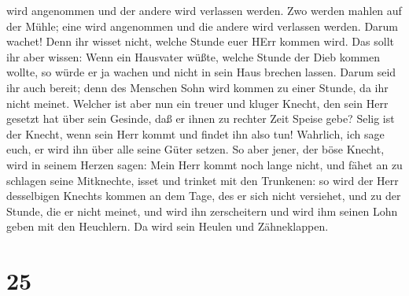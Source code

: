 wird angenommen und der andere wird verlassen werden.  Zwo
werden mahlen auf der Mühle; eine wird angenommen und die andere wird
verlassen werden.  Darum wachet! Denn ihr wisset nicht,
welche Stunde euer HErr kommen wird.  Das sollt ihr aber
wissen: Wenn ein Hausvater wüßte, welche Stunde der Dieb kommen wollte,
so würde er ja wachen und nicht in sein Haus brechen lassen.
 Darum seid ihr auch bereit; denn des Menschen Sohn wird
kommen zu einer Stunde, da ihr nicht meinet.  Welcher ist
aber nun ein treuer und kluger Knecht, den sein Herr gesetzt hat über
sein Gesinde, daß er ihnen zu rechter Zeit Speise gebe? 
Selig ist der Knecht, wenn sein Herr kommt und findet ihn also tun!
 Wahrlich, ich sage euch, er wird ihn über alle seine Güter
setzen.  So aber jener, der böse Knecht, wird in seinem
Herzen sagen: Mein Herr kommt noch lange nicht,  und fähet
an zu schlagen seine Mitknechte, isset und trinket mit den Trunkenen:
 so wird der Herr desselbigen Knechts kommen an dem Tage,
des er sich nicht versiehet, und zu der Stunde, die er nicht meinet,
 und wird ihn zerscheitern und wird ihm seinen Lohn geben
mit den Heuchlern. Da wird sein Heulen und Zähneklappen.

\hypertarget{section-24}{%
\section{25}\label{section-24}}

